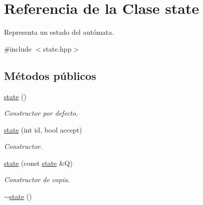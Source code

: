 \hypertarget{classstate}{}\section{Referencia de la Clase state}
\label{classstate}


Representa un estado del autómata.  




{\ttfamily \#include $<$state.\+hpp$>$}

\subsection*{Métodos públicos}
\begin{DoxyCompactItemize}
\item 
\hypertarget{classstate_aee920d9f534640451f22b3525f9cb9de}{}\hyperlink{classstate_aee920d9f534640451f22b3525f9cb9de}{state} ()\label{classstate_aee920d9f534640451f22b3525f9cb9de}

\begin{DoxyCompactList}\small\item\em Constructor por defecto. \end{DoxyCompactList}\item 
\hyperlink{classstate_a4a06c3b99fef0260bb8de5e8d8ba2d16}{state} (int id, bool accept)
\begin{DoxyCompactList}\small\item\em Constructor. \end{DoxyCompactList}\item 
\hypertarget{classstate_af2f12478890cae48ded72bf564f9d340}{}\hyperlink{classstate_af2f12478890cae48ded72bf564f9d340}{state} (const \hyperlink{classstate}{state} \&Q)\label{classstate_af2f12478890cae48ded72bf564f9d340}

\begin{DoxyCompactList}\small\item\em Constructor de copia. \end{DoxyCompactList}\item 
\hypertarget{classstate_a60216b51b01ca0ebe9786ec2da66568f}{}\hyperlink{classstate_a60216b51b01ca0ebe9786ec2da66568f}{$\sim$state} ()\label{classstate_a60216b51b01ca0ebe9786ec2da66568f}


\end{DoxyCompactItemize}

